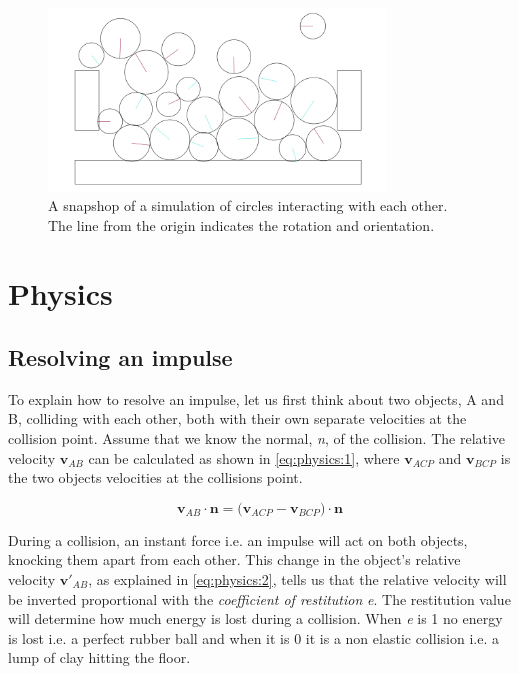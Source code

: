 \documentclass[a4paper,12pt]{report}
\begin{document}
\begin{figure}[!ht]
    \centering
    \includegraphics[width=0.8\textwidth]{figures/snapshot.png}
    \caption{A snapshop of a simulation of circles interacting with each other. The line from the origin indicates the rotation and orientation.}
    \label{fig:snapshot}
\end{figure}


\chapter{Physics}

\section{Resolving an impulse}

To explain how to resolve an impulse\cite{gdm}, let us first think about two objects, A and B, colliding with each other, both with their own separate velocities at the collision point. Assume that we know the normal, \emph{n}, of the collision. The relative velocity $\mathbf v_{AB}$ can be calculated as shown in \ref{eq:physics:1}, where $\mathbf v_{ACP}$ and $\mathbf v_{BCP}$ is the two objects velocities at the collisions point.

\begin{equation}
\mathbf v_{AB}\cdot \mathbf n=\mathbf (\mathbf v_{ACP} - \mathbf v_{BCP})\cdot \mathbf n
\label{eq:physics:1}
\end{equation}

During a collision, an instant force i.e. an impulse will act on both objects, knocking them apart from each other. This change in the object’s relative velocity $\mathbf v'_{AB}$, as explained in \ref{eq:physics:2}, tells us that the relative velocity will be inverted proportional with the \emph{coefficient of restitution} \emph{e}. The restitution value will determine how much energy is lost during a collision. When \emph{e} is 1 no energy is lost i.e. a perfect rubber ball and when it is 0 it is a non elastic collision i.e. a lump of clay hitting the floor.
\end{document}
